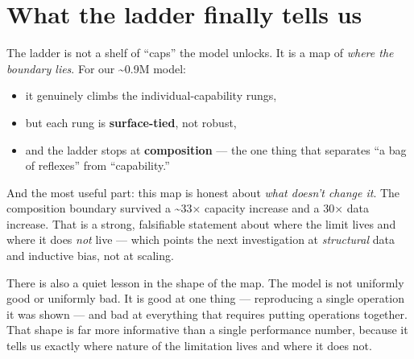 \section{What the ladder finally tells
us}\label{what-the-ladder-finally-tells-us}

The ladder is not a shelf of ``caps'' the model unlocks. It is a map of
\emph{where the boundary lies}. For our \textasciitilde0.9M model:

\begin{itemize}
\tightlist
\item
  it genuinely climbs the individual-capability rungs,
\item
  but each rung is \textbf{surface-tied}, not robust,
\item
  and the ladder stops at \textbf{composition} --- the one thing that
  separates ``a bag of reflexes'' from ``capability.''
\end{itemize}

And the most useful part: this map is honest about \emph{what doesn't
change it}. The composition boundary survived a \textasciitilde33×
capacity increase and a 30× data increase. That is a strong, falsifiable
statement about where the limit lives and where it does \emph{not} live
--- which points the next investigation at \emph{structural} data and
inductive bias, not at scaling.

There is also a quiet lesson in the shape of the map. The model is not
uniformly good or uniformly bad. It is good at one thing --- reproducing
a single operation it was shown --- and bad at everything that requires
putting operations together. That shape is far more informative than a
single performance number, because it tells us exactly where nature of
the limitation lives and where it does not.
